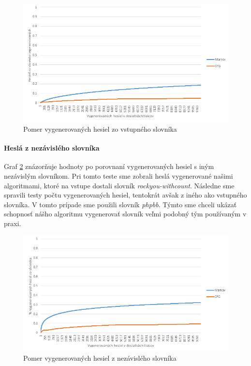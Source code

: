 \begin{figure}[ht]
    \centering
    \includegraphics[width=1\textwidth]{sameDictAcc}
    \caption{Pomer vygenerovaných hesiel zo vstupného slovníka}
    \label{fig:sameDictAcc}
\end{figure}

\paragraph{Heslá z nezávislého slovníka}
Graf \ref{fig:otherDictAcc} znázorňuje hodnoty po porovnaní vygenerovaných hesiel s iným nezávislým slovníkom. Pri tomto teste sme zobrali heslá vygenerované našimi algoritmami, ktoré na vstupe dostali slovník \emph{rockyou-withcount}. Následne sme spravili testy počtu vygenerovaných hesiel, tentokrát avšak z iného ako vstupného slovníka. V tomto prípade sme použili slovník \emph{phpbb}. Týmto sme chceli ukázať schopnosť nášho algoritmu vygenerovať slovník veľmi podobný tým používaným v praxi.

\begin{figure}[ht]
    \centering
    \includegraphics[width=1\textwidth]{otherDictAcc}
    \caption{Pomer vygenerovaných hesiel z nezávislého slovníka}
    \label{fig:otherDictAcc}
\end{figure}


